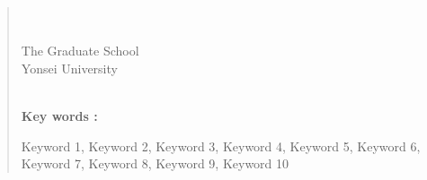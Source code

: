 
\clearpage 
\begin{abstract}

\begin{center}
{\Huge\txtTitle}
\end{center}
\begin{flushright}
\parbox[t]{0.9\textwidth}
{\begin{flushright}
\txtAuthor\\
\txtDepartment \\
The Graduate School \\
Yonsei University
\end{flushright}}
\end{flushright}
\vspace{1em}

\lipsum[2]

 \noindent
\hrulefill\\
{\bf Key words : }
\parbox[t]{0.8\textwidth}{
    Keyword 1, Keyword 2, Keyword 3, Keyword 4, Keyword 5, Keyword 6, Keyword 7, Keyword 8, Keyword 9, Keyword 10
}
\end{abstract}
                                           